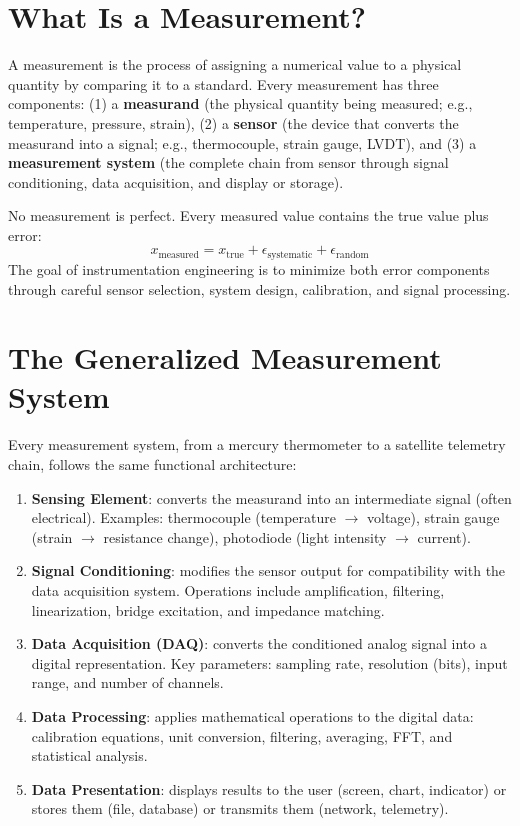 \documentclass[11pt,letterpaper,twoside,openany]{book}
\begin{document}
\section{What Is a Measurement?}
A measurement is the process of assigning a numerical value to a physical quantity by comparing it to a standard. Every measurement has three components: (1) a \textbf{measurand} (the physical quantity being measured; e.g., temperature, pressure, strain), (2) a \textbf{sensor} (the device that converts the measurand into a signal; e.g., thermocouple, strain gauge, LVDT), and (3) a \textbf{measurement system} (the complete chain from sensor through signal conditioning, data acquisition, and display or storage).

No measurement is perfect. Every measured value contains the true value plus error:
\begin{equation}
x_{\text{measured}} = x_{\text{true}} + \epsilon_{\text{systematic}} + \epsilon_{\text{random}}
\end{equation}
The goal of instrumentation engineering is to minimize both error components through careful sensor selection, system design, calibration, and signal processing.

\section{The Generalized Measurement System}
Every measurement system, from a mercury thermometer to a satellite telemetry chain, follows the same functional architecture:

\begin{enumerate}[leftmargin=1.5em]
\item \textbf{Sensing Element}: converts the measurand into an intermediate signal (often electrical). Examples: thermocouple (temperature $\to$ voltage), strain gauge (strain $\to$ resistance change), photodiode (light intensity $\to$ current).
\item \textbf{Signal Conditioning}: modifies the sensor output for compatibility with the data acquisition system. Operations include amplification, filtering, linearization, bridge excitation, and impedance matching.
\item \textbf{Data Acquisition (DAQ)}: converts the conditioned analog signal into a digital representation. Key parameters: sampling rate, resolution (bits), input range, and number of channels.
\item \textbf{Data Processing}: applies mathematical operations to the digital data: calibration equations, unit conversion, filtering, averaging, FFT, and statistical analysis.
\item \textbf{Data Presentation}: displays results to the user (screen, chart, indicator) or stores them (file, database) or transmits them (network, telemetry).
\end{enumerate}
\end{document}
